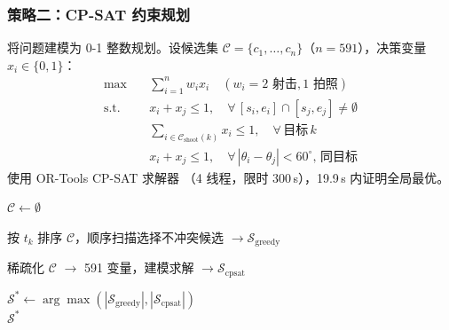 \subsubsection{策略二：CP-SAT 约束规划}

将问题建模为 0-1 整数规划。设候选集 $\mathcal{C} = \{c_1, \ldots, c_n\}$（$n=591$），决策变量 $x_i \in \{0,1\}$：
\begin{align}
    \max \quad & \sum_{i=1}^{n} w_i x_i \quad (w_i = 2 \text{ 射击}, 1 \text{ 拍照}) \label{eq:cpsat_obj} \\
    \text{s.t.} \quad & x_i + x_j \le 1, \quad \forall\, [s_i, e_i] \cap [s_j, e_j] \neq \emptyset \label{eq:cpsat_overlap} \\
    & \sum_{i \in \mathcal{C}_{\text{shoot}}(k)} x_i \le 1, \quad \forall\, \text{目标}\, k \label{eq:cpsat_unique} \\
    & x_i + x_j \le 1, \quad \forall\, |\theta_i - \theta_j| < 60^\circ,\, \text{同目标} \label{eq:cpsat_angle}
\end{align}
使用 OR-Tools CP-SAT 求解器 \cite{ortools2024}（4 线程，限时 300\,s），19.9\,s 内证明全局最优。

\begin{algorithm}[htbp]
\caption{任务调度（贪心基线 + CP-SAT 精确解）}
\label{alg:p4_schedule}

$\mathcal{C} \leftarrow \emptyset$ \\

按 $t_k$ 排序 $\mathcal{C}$，顺序扫描选择不冲突候选 $\to \mathcal{S}_{\text{greedy}}$

稀疏化 $\mathcal{C}$ $\to$ 591 变量，建模求解 $\to \mathcal{S}_{\text{cpsat}}$

$\mathcal{S}^* \leftarrow \arg\max(|\mathcal{S}_{\text{greedy}}|, |\mathcal{S}_{\text{cpsat}}|)$ \\
\Return $\mathcal{S}^*$
\end{algorithm}

